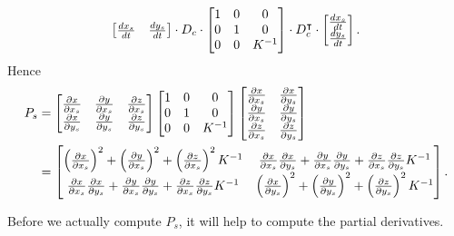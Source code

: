 \documentclass{ximera}
\begin{document}
\begin{problem}
\begin{freeResponse}
\begin{align*}
\begin{bmatrix}
      \frac{dx_s}{dt} & \frac{dy_s}{dt}
    \end{bmatrix}\cdot D_{c}\cdot
    \begin{bmatrix}
      1 & 0 & 0\\
      0 & 1 & 0\\
    0 & 0 & K^{-1}
    \end{bmatrix}
    \cdot
    D_{c}^\transpose
    \cdot \begin{bmatrix}
      \frac{dx_s}{dt} \\ \frac{dy_s}{dt}
    \end{bmatrix}.
  \end{align*}
    Hence
    \begin{align*}
      P_s &=
      \begin{bmatrix}
        \pp[x]{x_s} & \pp[y]{x_s} & \pp[z]{x_s} \\
        \pp[x]{y_s} & \pp[y]{y_s} & \pp[z]{y_s}
      \end{bmatrix}
      \begin{bmatrix}
        1 & 0 & 0\\
        0 & 1 & 0\\
        0 & 0 & K^{-1}
      \end{bmatrix}
      \begin{bmatrix}
        \pp[x]{x_s} & \pp[x]{y_s}\\ 
        \pp[y]{x_s} & \pp[y]{y_s}\\
        \pp[z]{x_s} & \pp[z]{y_s}
      \end{bmatrix}\\
      &=
      \begin{bmatrix}
        \left(\pp[x]{x_s}\right)^2 + \left(\pp[y]{x_s}\right)^2 + \left(\pp[z]{x_s}\right)^2K^{-1} & \pp[x]{x_s}\pp[x]{y_s} + \pp[y]{x_s}\pp[y]{y_s} + \pp[z]{x_s}\pp[z]{y_s} K^{-1}\\
        \pp[x]{x_s}\pp[x]{y_s} + \pp[y]{x_s}\pp[y]{y_s} + \pp[z]{x_s}\pp[z]{y_s} K^{-1}       & \left(\pp[x]{y_s}\right)^2 + \left(\pp[y]{y_s}\right)^2 + \left(\pp[z]{y_s}\right)^2K^{-1}
      \end{bmatrix}.
    \end{align*}
  \end{freeResponse}
\end{problem}


Before we actually compute $P_s$, it will help to compute the partial
derivatives.
\end{document}
